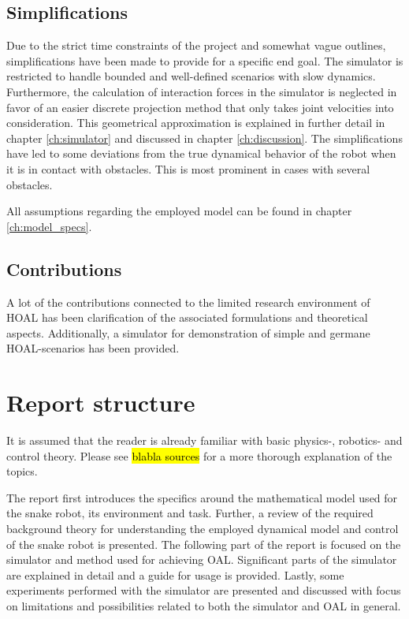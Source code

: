 \subsection{Simplifications}
Due to the strict time constraints of the project and somewhat vague outlines, simplifications have been made to provide for a specific end goal. The simulator is restricted to handle bounded and well-defined scenarios with slow dynamics. Furthermore, the calculation of interaction forces in the simulator is neglected in favor of an easier discrete projection method that only takes joint velocities into consideration. This geometrical approximation is explained in further detail in chapter \ref{ch:simulator} and discussed in chapter \ref{ch:discussion}. The simplifications have led to some deviations from the true dynamical behavior of the robot when it is in contact with obstacles. This is most prominent in cases with several obstacles.

All assumptions regarding the employed model can be found in chapter \ref{ch:model_specs}.

\subsection{Contributions}
A lot of the contributions connected to the limited research environment of HOAL has been clarification of the associated formulations and theoretical aspects. Additionally, a simulator for demonstration of simple and germane HOAL-scenarios has been provided.



\section{Report structure}
It is assumed that the reader is already familiar with basic physics-, robotics- and control theory. Please see \hl{blabla sources} for a more thorough explanation of the topics.

The report first introduces the specifics around the mathematical model used for the snake robot, its environment and task. Further, a review of the required background theory for understanding the employed dynamical model and control of the snake robot is presented. The following part of the report is focused on the simulator and method used for achieving OAL. Significant parts of the simulator are explained in detail and a guide for usage is provided. Lastly, some experiments performed with the simulator are presented and discussed with focus on limitations and possibilities related to both the simulator and OAL in general.